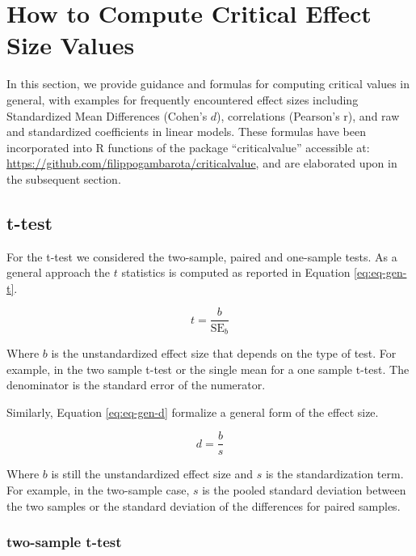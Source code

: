\documentclass[
  man]{apa7}
\begin{document}
\hypertarget{how-to-compute-critical-effect-size-values}{%
\section{How to Compute Critical Effect Size Values}\label{how-to-compute-critical-effect-size-values}}

In this section, we provide guidance and formulas for computing critical values in general, with examples for frequently encountered effect sizes including Standardized Mean Differences (Cohen's \(d\)), correlations (Pearson's r), and raw and standardized coefficients in linear models. These formulas have been incorporated into R functions of the package ``criticalvalue'' accessible at: \url{https://github.com/filippogambarota/criticalvalue}, and are elaborated upon in the subsequent section.

\hypertarget{t-test}{%
\subsection{t-test}\label{t-test}}

For the t-test we considered the two-sample, paired and one-sample tests. As a general approach the \(t\) statistics is computed as reported in Equation \eqref{eq:eq-gen-t}.

\begin{equation}
    \label{eq:eq-gen-t}
    t = \frac{b}{\text{SE}_{b}}
\end{equation}

Where \(b\) is the unstandardized effect size that depends on the type of test. For example, in the two sample t-test or the single mean for a one sample t-test. The denominator is the standard error of the numerator.

Similarly, Equation \eqref{eq:eq-gen-d} formalize a general form of the effect size.

\begin{equation}
    \label{eq:eq-gen-d}
    d = \frac{b}{s}
\end{equation}

Where \(b\) is still the unstandardized effect size and \(s\) is the standardization term. For example, in the two-sample case, \(s\) is the pooled standard deviation between the two samples or the standard deviation of the differences for paired samples.

\hypertarget{two-sample-t-test}{%
\subsubsection{two-sample t-test}\label{two-sample-t-test}}
\end{document}
